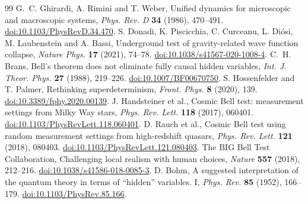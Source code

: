 \documentclass[11pt,a4paper]{article}
\theoremstyle{definition}
\theoremstyle{remark}\newtheorem{remark}[theorem]{Remark}
\begin{document}
\begin{thebibliography}{99}
 G.~C. Ghirardi, A. Rimini and T. Weber, Unified dynamics for microscopic and macroscopic systems, \emph{Phys. Rev. D} \textbf{34} (1986), 470--491. \href{https://doi.org/10.1103/PhysRevD.34.470}{doi:10.1103/PhysRevD.34.470}.
 S. Donadi, K. Piscicchia, C. Curceanu, L. Di\'osi, M. Laubenstein and A. Bassi, Underground test of gravity-related wave function collapse, \emph{Nature Phys.} \textbf{17} (2021), 74--78. \href{https://doi.org/10.1038/s41567-020-1008-4}{doi:10.1038/s41567-020-1008-4}.
 C.~H. Brans, Bell's theorem does not eliminate fully causal hidden variables, \emph{Int. J. Theor. Phys.} \textbf{27} (1988), 219--226. \href{https://doi.org/10.1007/BF00670750}{doi:10.1007/BF00670750}.
 S. Hossenfelder and T. Palmer, Rethinking superdeterminism, \emph{Front. Phys.} \textbf{8} (2020), 139. \href{https://doi.org/10.3389/fphy.2020.00139}{doi:10.3389/fphy.2020.00139}.
 J. Handsteiner et al., Cosmic Bell test: measurement settings from Milky Way stars, \emph{Phys. Rev. Lett.} \textbf{118} (2017), 060401. \href{https://doi.org/10.1103/PhysRevLett.118.060401}{doi:10.1103/PhysRevLett.118.060401}.
 D. Rauch et al., Cosmic Bell test using random measurement settings from high-redshift quasars, \emph{Phys. Rev. Lett.} \textbf{121} (2018), 080403. \href{https://doi.org/10.1103/PhysRevLett.121.080403}{doi:10.1103/PhysRevLett.121.080403}.
 The BIG Bell Test Collaboration, Challenging local realism with human choices, \emph{Nature} \textbf{557} (2018), 212--216. \href{https://doi.org/10.1038/s41586-018-0085-3}{doi:10.1038/s41586-018-0085-3}.
 D. Bohm, A suggested interpretation of the quantum theory in terms of ``hidden'' variables. I, \emph{Phys. Rev.} \textbf{85} (1952), 166--179. \href{https://doi.org/10.1103/PhysRev.85.166}{doi:10.1103/PhysRev.85.166}.
\end{thebibliography}
\end{document}
